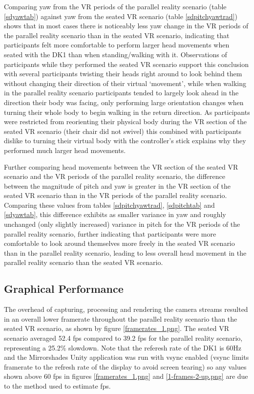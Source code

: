 Comparing yaw from the VR periods of the parallel reality scenario (table \ref{sdyawtab}) against yaw from the seated VR scenario (table \ref{sdpitchyawtrad}) shows that in most cases there is noticeably less yaw change in the VR periods of the parallel reality scenario than in the seated VR scenario, indicating that participants felt more comfortable to perform larger head movements when seated with the DK1 than when standing/walking with it. Observations of participants while they performed the seated VR scenario support this conclusion with several participants twisting their heads right around to look behind them without changing their direction of their virtual `movement', while when walking in the parallel reality scenario participants tended to largely look ahead in the direction their body was facing, only performing large orientation changes when turning their whole body to begin walking in the return direction. As participants were restricted from reorienting their physical body during the VR section of the seated VR scenario (their chair did not swivel) this combined with participants dislike to turning their virtual body with the controller's stick explains why they performed much larger head movements.

Further comparing head movements between the VR section of the seated VR scenario and the VR periods of the parallel reality scenario, the difference between the magnitude of pitch and yaw is greater in the VR section of the seated VR scenario than in the VR periods of the parallel reality scenario. Comparing these values from tables \ref{sdpitchyawtrad}, \ref{sdpitchtab} and \ref{sdyawtab}, this difference exhibits as smaller variance in yaw and roughly unchanged (only slightly increased) variance in pitch for the VR periods of the parallel reality scenario, further indicating that participants were more comfortable to look around themselves more freely in the seated VR scenario than in the parallel reality scenario, leading to less overall head movement in the parallel reality scenario than the seated VR scenario.


\subsection{Graphical Performance}
\label{stage-1-framerates}
The overhead of capturing, processing and rendering the camera streams resulted in an overall lower framerate throughout the parallel reality scenario than the seated VR scenario, as shown by figure \ref{framerates_1.png}. The seated VR scenario averaged 52.4 fps compared to 39.2 fps for the parallel reality scenario, representing a 25.2\% slowdown. Note that the referesh rate of the DK1 is 60Hz and the Mirrorshades Unity application was run with vsync enabled (vsync limits framerate to the refresh rate of the display to avoid screen tearing) so any values shown above 60 fps in figures \ref{framerates_1.png} and \ref{1-frames-2-up.png} are due to the method used to estimate fps.

